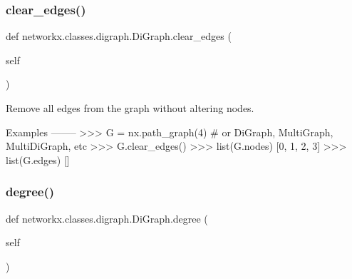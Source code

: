 \subsubsection{\texorpdfstring{clear\+\_\+edges()}{clear\_edges()}}
{\footnotesize\ttfamily def networkx.\+classes.\+digraph.\+Di\+Graph.\+clear\+\_\+edges (\begin{DoxyParamCaption}\item[{}]{self }\end{DoxyParamCaption})}

\begin{DoxyVerb}Remove all edges from the graph without altering nodes.

Examples
--------
>>> G = nx.path_graph(4)  # or DiGraph, MultiGraph, MultiDiGraph, etc
>>> G.clear_edges()
>>> list(G.nodes)
[0, 1, 2, 3]
>>> list(G.edges)
[]\end{DoxyVerb}
 \mbox{\label{classnetworkx_1_1classes_1_1digraph_1_1DiGraph_acebffe942867936552e382da7308e02a}} 
\subsubsection{\texorpdfstring{degree()}{degree()}}
{\footnotesize\ttfamily def networkx.\+classes.\+digraph.\+Di\+Graph.\+degree (\begin{DoxyParamCaption}\item[{}]{self }\end{DoxyParamCaption})}

